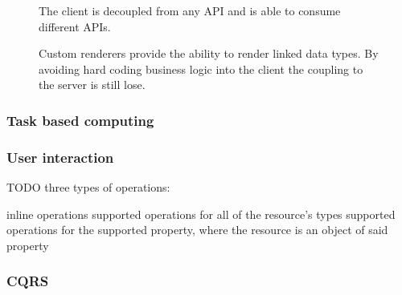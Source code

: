 \begin{figure}[!htb]
  \caption{\label{fig:my-label} The client is decoupled from any API and is able to consume different APIs.}
\end{figure}

\begin{figure}[!htb]
  \caption{\label{fig:my-label} Custom renderers provide the ability to render linked data types. By avoiding hard coding business logic into the client the coupling to the server is still lose.}
\end{figure}

\subsubsection{Task based computing}\label{interaction}

\subsubsection{User interaction}\label{interaction}

TODO three types of operations:

inline operations
supported operations for all of the resource's types
supported operations for the supported property, where the resource is an object of said property

\subsubsection{CQRS}\label{interaction}
